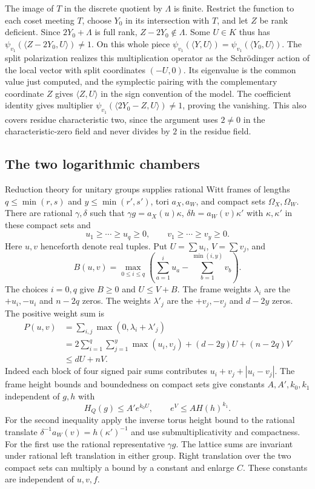The image of \(T\) in the discrete quotient by \(\Lambda\) is
finite. Restrict the function to each coset meeting \(T\), choose
\(Y_0\) in its intersection with \(T\), and let \(Z\) be rank deficient.
Since \(2Y_0+\Lambda\) is full rank, \(Z-2Y_0\notin\Lambda\).
Some \(U\in K\) thus has
\(\psi_{v_1}(\langle Z-2Y_0,U\rangle)\ne1\). On this whole
piece \(\psi_{v_1}(\langle Y,U\rangle)
=\psi_{v_1}(\langle Y_0,U\rangle)\).
The split polarization realizes this multiplication operator as the
Schr\"odinger action of the local vector with split coordinates
\((-U,0)\). Its eigenvalue is the common value just computed, and
the symplectic pairing with the complementary coordinate \(Z\)
gives \(\langle Z,U\rangle\) in the sign convention of the model.
The coefficient identity gives multiplier
\(\psi_{v_1}(\langle 2Y_0-Z,U\rangle)\ne1\), proving the vanishing.
This also covers residue characteristic two, since the argument uses
\(2\ne0\) in the characteristic-zero field and never divides by
\(2\) in the residue field.


\subsection{The two logarithmic chambers}

Reduction theory for unitary groups supplies rational Witt frames
of lengths \(q\le\min(r,s)\) and \(y\le\min(r',s')\), tori
\(a_X,a_W\), and compact sets \(\Omega_X,\Omega_W\). There are
rational \(\gamma,\delta\) such that
\(\gamma g=a_X(u)\kappa\), \(\delta h=a_W(v)\kappa'\) with
\(\kappa,\kappa'\) in these compact sets and
\[
 u_1\ge\cdots\ge u_q\ge0,\qquad v_1\ge\cdots\ge v_y\ge0.
\]
Here \(u,v\) henceforth denote real tuples. Put \(U=\sum u_i\),
\(V=\sum v_j\), and
\[
 B(u,v)=\max_{0\le i\le q}
   \left(\sum_{a=1}^i u_a-\sum_{b=1}^{\min(i,y)}v_b\right).
\]
The choices \(i=0,q\) give \(B\ge0\) and \(U\le V+B\). The frame
weights \(\lambda_i\) are the \(+u_i,-u_i\) and \(n-2q\) zeros.
The weights \(\lambda'_j\) are the \(+v_j,-v_j\) and \(d-2y\) zeros.
The positive weight sum is
\begin{align*}
 P(u,v)&=\sum_{i,j}\max(0,\lambda_i+\lambda'_j)\\
 &=2\sum_{i=1}^{q}\sum_{j=1}^{y}\max(u_i,v_j)
                  +(d-2y)U+(n-2q)V\\
 &\le dU+nV .
\end{align*}
Indeed each block of four signed pair sums contributes
\(u_i+v_j+|u_i-v_j|\). The frame height bounds and boundedness on
compact sets give constants \(A,A',k_0,k_1\) independent of \(g,h\) with
\[
 H_Q(g)\le A'e^{k_0U},\qquad e^V\le A H(h)^{k_1}.
\]
For the second inequality apply the inverse torus height bound
to the rational translate \(\delta^{-1}a_W(v)=h(\kappa')^{-1}\)
and use submultiplicativity and compactness. For the first use the
rational representative \(\gamma g\). The lattice sums are invariant
under rational left translation in either group. Right translation
over the two compact sets can multiply a bound by a constant and
enlarge \(C\). These constants are independent of \(u,v,f\).

